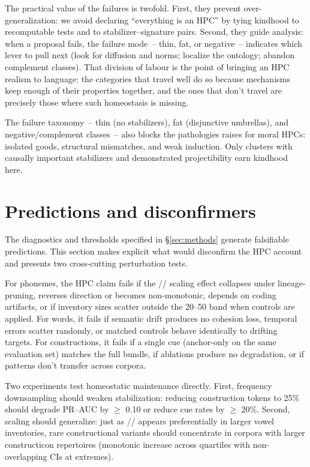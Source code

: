 \documentclass[12pt]{article}
\begin{document}
The practical value of the failures is twofold. First, they prevent over-generalization: we avoid declaring \enquote{everything is an \textsc{HPC}} by tying kindhood to recomputable tests and to stabilizer–signature pairs. Second, they guide analysis: when a proposal fails, the failure mode~-- thin, fat, or negative~-- indicates which lever to pull next (look for diffusion and norms; localize the ontology; abandon complement classes). That division of labour is the point of bringing an \textsc{HPC} realism to language: the categories that travel well do so because mechanisms keep enough of their properties together, and the ones that don't travel are precisely those where such homeostasis is missing.

The failure taxonomy~-- thin (no stabilizers), fat (disjunctive umbrellas), and  negative/complement classes~-- also blocks the pathologies \citet{Rubin2008} raises for  moral HPCs: isolated goods, structural mismatches, and weak induction. Only  clusters with causally important stabilizers and demonstrated projectibility  earn kindhood here.

\section{Predictions and disconfirmers}\label{sec:predictions}

The diagnostics and thresholds specified in \S\ref{sec:methods} generate falsifiable predictions. This section makes explicit what would disconfirm the HPC account and presents two cross-cutting perturbation tests.

For phonemes, the HPC claim fails if the // scaling effect collapses under lineage-pruning, reverses direction or becomes non-monotonic, depends on coding artifacts, or if inventory sizes scatter outside the 20--50 band when controls are applied. For words, it fails if semantic drift produces no cohesion loss, temporal errors scatter randomly, or matched controls behave identically to drifting targets. For constructions, it fails if a single cue (anchor-only on the same evaluation set) matches the full bundle, if ablations produce no degradation, or if patterns don't transfer across corpora.

Two experiments test homeostatic maintenance directly. First, frequency downsampling should weaken stabilization: reducing construction tokens to 25\% should degrade PR--AUC by $\ge$ 0.10 or reduce cue rates by $\ge$ 20\%. Second, scaling should generalize: just as // appears preferentially in larger vowel inventories, rare constructional variants should concentrate in corpora with larger constructicon repertoires (monotonic increase across quartiles with non-overlapping CIs at extremes).
\end{document}
